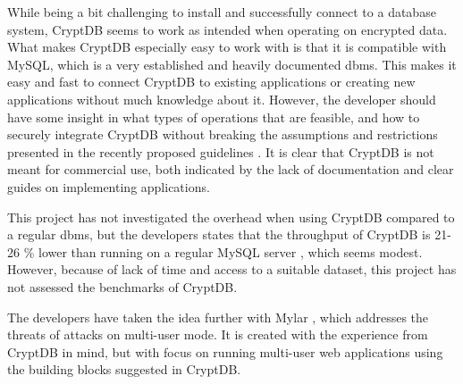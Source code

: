 While being a bit challenging to install and successfully connect to a database system, CryptDB seems to work as intended when operating on encrypted data. What makes CryptDB especially easy to work with is that it is compatible with MySQL, which is a very established and heavily documented \gls{dbms}. This makes it easy and fast to connect CryptDB to existing applications or creating new applications without much knowledge about it. However, the developer should have some insight in what types of operations that are feasible, and how to securely integrate CryptDB without breaking the assumptions and restrictions presented in the recently proposed guidelines \cite{cryptdb_guidelines}. It is clear that CryptDB is not meant for commercial use, both indicated by the lack of documentation and clear guides on implementing applications.

This project has not investigated the overhead when using CryptDB compared to a regular \gls{dbms}, but the developers states that the throughput of CryptDB is 21-26 \% lower than running on a regular MySQL server \citep{CryptDB_Main_Paper}, which seems modest. However, because of lack of time and access to a suitable dataset, this project has not assessed the benchmarks of CryptDB.

The developers have taken the idea further with Mylar \cite{mylar_homepage}, which addresses the threats of attacks on multi-user mode. It is created with the experience from CryptDB in mind, but with focus on running multi-user web applications using the building blocks suggested in CryptDB.